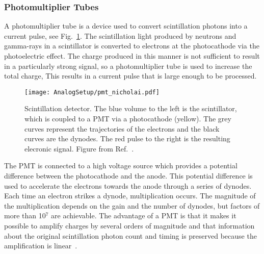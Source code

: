 \documentclass[main.tex]{subfiles}
\begin{document}
\subsubsection{Photomultiplier Tubes}
A photomultiplier tube is a device used to convert scintillation photons into a current pulse, see Fig.~\ref{fig:pmt}. The scintillation light produced by neutrons and gamma-rays in a scintillator is converted to electrons at the photocathode via the photoelectric effect. The charge produced in this manner is not sufficient to result in a particularly strong signal, so a photomultiplier tube is used to increase the total charge, This results in a current pulse that is large enough to be processed. 

\begin{figure}[ht]
	\centering
    	\texttt{[image: AnalogSetup/pmt\_nicholai.pdf]}
        \caption[Scintillation detector]{Scintillation detector. The blue volume to the left is the scintillator, which is coupled to a PMT via a photocathode (yellow). The grey curves represent the trajectories of the electrons and the black curves are the dynodes. The red pulse to the right is the resulting elecronic signal. Figure from Ref.~\cite{Mauritzsson}.}
	    \label{fig:pmt} 
\end{figure}

The PMT is connected to a high voltage source which provides a potential difference between the photocathode and the anode. This potential difference is used to accelerate the electrons towards the anode through a series of dynodes. Each time an electron strikes a dynode, multiplication occurs. 
The magnitude of the multiplication depends on the gain and the number of dynodes, but factors of more than 10$^\text{7}$ are achievable. 
The advantage of a PMT is that it makes it possible to amplify charges by several orders of magnitude and that information about the original scintillation photon count and timing is preserved because the amplification is linear~\cite{Leo}.
\end{document}
